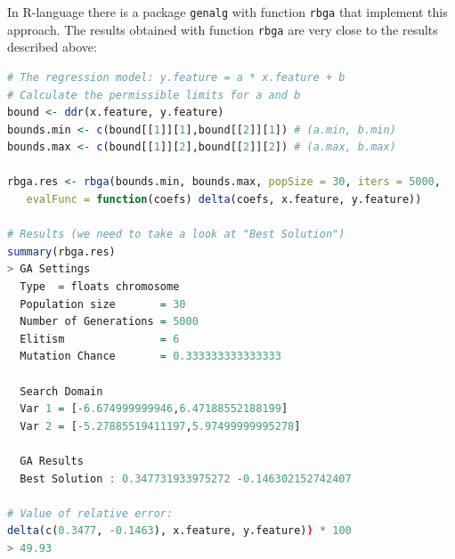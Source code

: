 In R-language there is a package \texttt{genalg} with function \texttt{rbga} that implement this approach. The results obtained with function \texttt{rbga} are very close to the results described above:
\begin{lstlisting}[language=R]
# The regression model: y.feature = a * x.feature + b
# Calculate the permissible limits for a and b 
bound <- ddr(x.feature, y.feature)
bounds.min <- c(bound[[1]][1],bound[[2]][1]) # (a.min, b.min) 
bounds.max <- c(bound[[1]][2],bound[[2]][2]) # (a.max, b.max)

rbga.res <- rbga(bounds.min, bounds.max, popSize = 30, iters = 5000,
   evalFunc = function(coefs) delta(coefs, x.feature, y.feature))

# Results (we need to take a look at "Best Solution")
summary(rbga.res)
> GA Settings
  Type  = floats chromosome
  Population size       = 30
  Number of Generations = 5000
  Elitism               = 6
  Mutation Chance       = 0.333333333333333
  
  Search Domain
  Var 1 = [-6.674999999946,6.47188552188199]
  Var 2 = [-5.27885519411197,5.97499999995278]
  
  GA Results
  Best Solution : 0.347731933975272 -0.146302152742407 

# Value of relative error:
delta(c(0.3477, -0.1463), x.feature, y.feature)) * 100
> 49.93
\end{lstlisting}